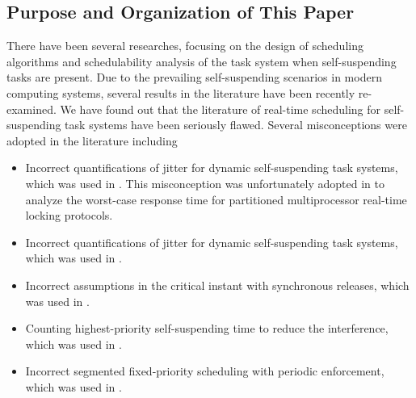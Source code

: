 \subsection{Purpose and Organization of This Paper}

There have been several researches, focusing on the design of scheduling algorithms and schedulability analysis of the task system when self-suspending tasks are present. Due to the prevailing self-suspending scenarios in modern computing systems, several results in the literature have been recently re-examined. We have found out that the literature of real-time scheduling for self-suspending task systems have been seriously flawed. Several misconceptions were adopted in the literature including 
\begin{itemize}
\item Incorrect quantifications of jitter for dynamic self-suspending
  task systems, which was used in
  \cite{ECRTS-AudsleyB04,RTAS-AudsleyB04,RTCSA-KimCPKH95}.  This
  misconception was unfortunately adopted in \cite{zeng-2011,bbb-2013,yang-2013,kim-2014,han-2014,carminati-2014,yang-2014,lakshmanan-2009} to analyze the worst-case response time for
  partitioned multiprocessor real-time locking protocols.
\item Incorrect quantifications of jitter for dynamic self-suspending
  task systems, which was used in  \cite{RTCSA-BletsasA05}.
\item Incorrect assumptions in the critical instant with
  synchronous releases, which was used in \cite{LR:rtas10}.
\item Counting highest-priority self-suspending time to reduce the
  interference, which was used in  \cite{RTSS-KimANR13}. 
\item Incorrect segmented fixed-priority scheduling with periodic
  enforcement, which was used in \cite{RTSS-KimANR13,DBLP:journals/ieicet/DingTT09}.
\end{itemize}

